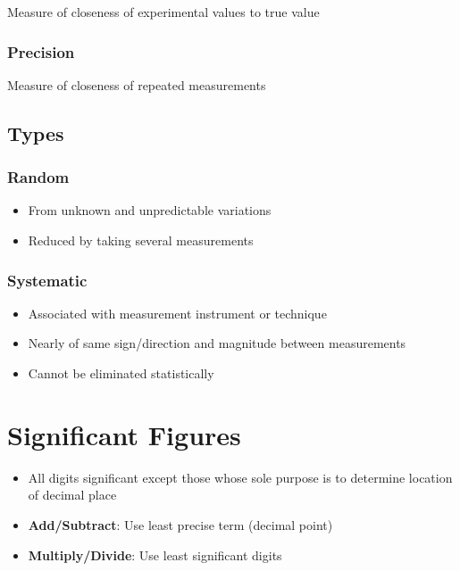 \documentclass[12pt]{article}
\newcommand{\hilight}[1]{\colorbox{Dandelion}{#1}}
\begin{document}
Measure of closeness of \hilight{experimental} values to \hilight{true value}

\subsubsection{Precision}

Measure of closeness of \hilight{repeated measurements}

\subsection{Types}

\subsubsection{Random}

\begin{itemize}
	\item From unknown and unpredictable variations
	\item Reduced by taking several measurements
\end{itemize}

\subsubsection{Systematic}

\begin{itemize}
	\item Associated with measurement instrument or technique
	\item Nearly of same sign/direction and magnitude between measurements
	\item Cannot be eliminated statistically
\end{itemize}

\section{Significant Figures}

\begin{itemize}
	\item All digits significant \hilight{except} those whose sole purpose is to \hilight{determine location of decimal place}
	\item {\bf Add/Subtract}: Use least precise term (decimal point)
	\item {\bf Multiply/Divide}: Use least significant digits
\end{itemize}
\end{document}
